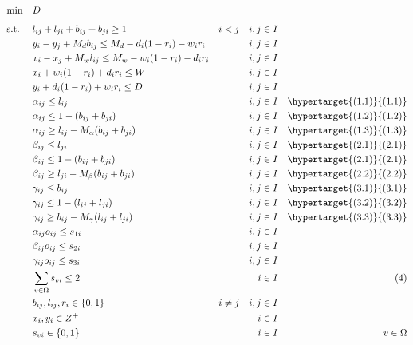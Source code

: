 \begin{equation*}
    \begin{aligned}
    & \underset{}{\text{min}}
    & & D \\
    & \text{s.t.} & &  l_{ij} + l_{ji} + b_{ij} + b_{ji} \geq 1 & i < j && i,j \in I \\
    & & & y_i - y_j + M_d b_{ij} \leq M_d - d_i (1 - r_i) - w_i r_i & & & i,j \in I \\
    & & & x_i - x_j + M_w l_{ij} \leq M_w - w_i (1 - r_i) - d_i r_i & & & i,j \in I \\
    & & & x_i + w_i (1 - r_i) + d_i r_i \leq W & & & i,j \in I \\
    & & & y_i + d_i (1 - r_i) + w_i r_i \leq D & & & i,j \in I \\
    & & & \alpha_{ij} \leq l_{ij} & & & i,j \in I & & \hypertarget{(1.1)}{(1.1)}\\
    & & & \alpha_{ij} \leq 1 - (b_{ij} + b_{ji}) & & & i,j \in I & & \hypertarget{(1.2)}{(1.2)} \\
    & & & \alpha_{ij} \geq l_{ij} - M_\alpha(b_{ij} + b_{ji}) & & & i,j \in I  & & \hypertarget{(1.3)}{(1.3)} \\
    & & & \beta_{ij} \leq l_{ji} & & & i,j \in I & & \hypertarget{(2.1)}{(2.1)}\\
    & & & \beta_{ij} \leq 1 - (b_{ij} + b_{ji}) & & & i,j \in I & & \hypertarget{(2.1)}{(2.1)}\\
    & & & \beta_{ij} \geq l_{ji} - M_\beta(b_{ij} + b_{ji}) & & & i,j \in I & & \hypertarget{(2.2)}{(2.2)}\\
    & & & \gamma_{ij} \leq b_{ij} & & & i,j \in I & & \hypertarget{(3.1)}{(3.1)}\\
    & & & \gamma_{ij} \leq 1 - (l_{ij} + l_{ji}) & & & i,j \in I & & \hypertarget{(3.2)}{(3.2)}\\
    & & & \gamma_{ij} \geq b_{ij} - M_\gamma(l_{ij} + l_{ji}) & & & i,j \in I & & \hypertarget{(3.3)}{(3.3)}\\
    & & & \alpha_{ij}o_{ij} \leq s_{1i}  & & & i,j \in I \\
    & & & \beta_{ij}o_{ij} \leq s_{2i}  & & & i,j \in I \\
    & & & \gamma_{ij}o_{ij} \leq s_{3i}  & & & i,j \in I \\
    & & & \sum_{v \in \Omega} s_{vi} \leq 2  & & & i \in I & & (4) \\
    & & & b_{ij}, l_{ij}, r_i \in \{0,1\} & i \neq j & & i,j \in I \\
    & & & x_{i}, y_{i} \in Z^{+} & & & i \in I \\
    & & & s_{vi} \in \{0,1\} & & & i \in I & & v\in \Omega\\
    \end{aligned}
\end{equation*}

